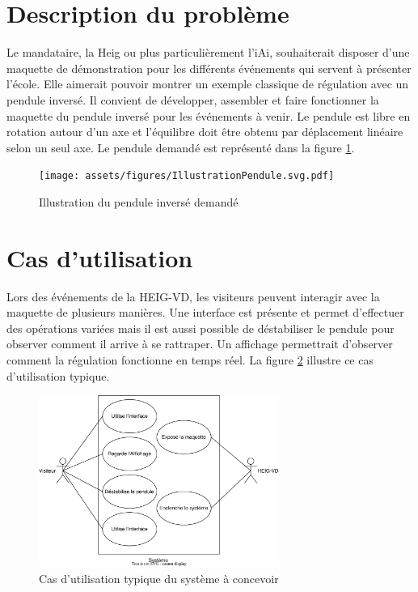 \section{Description du problème}\label{sec:DescProb}
Le mandataire, la \acrshort{Heig} ou plus particulièrement l'\acrshort{iAi}, souhaiterait disposer d'une maquette de démonstration pour les différents événements qui servent à présenter l'école. Elle aimerait pouvoir montrer un exemple classique de régulation avec un pendule inversé.
Il convient de développer, assembler et faire fonctionner la maquette du pendule inversé pour les événements à venir. Le pendule est libre en rotation autour d'un axe et l'équilibre doit être obtenu par déplacement linéaire selon un seul axe. Le pendule demandé est représenté dans la figure \ref{fig:Illustration}.

\begin{figure}[H]
  \centering
  \texttt{[image: assets/figures/IllustrationPendule.svg.pdf]}
  \caption{Illustration du pendule inversé demandé}
  \label{fig:Illustration}
\end{figure}

\section{Cas d'utilisation}\label{sec:CasUtil}
Lors des événements de la HEIG-VD, les visiteurs peuvent interagir avec la maquette de plusieurs manières. Une interface est présente et permet d'effectuer des opérations variées mais il est aussi possible de déstabiliser le pendule pour observer comment il arrive à se rattraper. Un affichage permettrait d'observer comment la régulation fonctionne en temps réel.
La figure \ref{fig:CasUtil} illustre ce cas d'utilisation typique.

\begin{figure}[H]
  \centering
  \includegraphics[width = 0.7\textwidth]{assets/figures/CasUtil.drawio.svg}
  \caption{Cas d'utilisation typique  du système à concevoir}
  \label{fig:CasUtil}
\end{figure}

